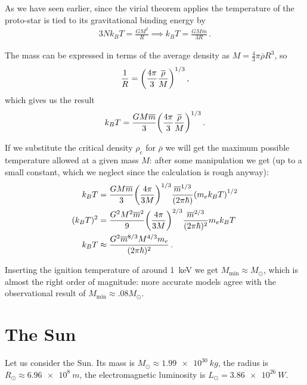 \documentclass[main.tex]{subfiles}
\begin{document}
As we have seen earlier, since the virial theorem applies the temperature of the proto-star is tied to its gravitational binding energy by
%
\begin{align}
  3 N k_B T = \frac{GM^2}{R} \implies k_B T = \frac{GM \overline{m}}{3  R}
\,.
\end{align}

The mass can be expressed in terms of the average density as 
\(M = \frac{4}{3} \pi \overline{\rho} R^3 \), so 
%
\begin{align}
  \frac{1}{R} = \qty(\frac{4 \pi }{3} \frac{\overline{\rho}}{M})^{1/3}
\,,
\end{align}
%
which gives us the result 
%
\begin{align}
  k_B T = \frac{GM \overline{m}}{3} \qty(\frac{4 \pi }{3} \frac{\overline{\rho}}{M})^{1/3}
\,.
\end{align}

If we substitute the critical density \(\rho _c\) for \(\overline{\rho}\) we will get the maximum possible temperature allowed at a given mass \(M\): after some manipulation we get (up to a small constant, which we neglect since the calculation is rough anyway):
%
\begin{align}
  k_B T &= \frac{GM \overline{m}}{3} \qty(\frac{4 \pi }{3 M})^{1/3} \frac{\overline{m}^{1/3}}{(2 \pi \hbar)} \qty(m_e k_B T)^{1/2} \\
  (k_B T)^2 &= \frac{G^2M^2 \overline{m}^2}{9} 
  \qty(\frac{4 \pi }{3 M})^{2/3} \frac{\overline{m}^{2/3}}{(2 \pi \hbar)^2} m_e k_B T  \\
  k_B T &\approx \frac{G^2 \overline{m}^{8/3} M^{4/3} m_e}{(2 \pi \hbar)^2} 
\,.
\end{align}

Inserting the ignition temperature of around \SI{1}{keV} we get \(M _{\text{min}} \approx M_{\odot}\), which is almost the right order of magnitude: more accurate models agree with the observational result of \(M _{\text{min}} \approx \num{.08} M_{\odot}\). 

\section{The Sun}

Let us consider the Sun. Its mass is \(M_{\odot} \approx \SI{1.99e30}{kg}\), the radius is \(R_{\odot} \approx \SI{6.96e8}{m}\), the electromagnetic luminosity is \(L_{\odot} = \SI{3.86e26}{W}\). 
\end{document}

